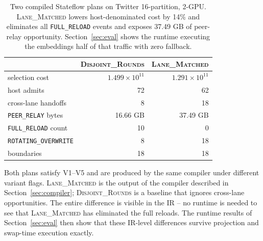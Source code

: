 \begin{table}[h]
\centering
\small
\begin{tabular}{lrr}
\toprule
 & \textsc{Disjoint\_Rounds} & \textsc{Lane\_Matched} \\
\midrule
selection cost        & $1.499 \times 10^{11}$ & $1.291 \times 10^{11}$ \\
host admits           & 72                     & 62                     \\
cross-lane handoffs   & 8                      & 18                     \\
\texttt{PEER\_RELAY} bytes & 16.66 GB          & 37.49 GB               \\
\texttt{FULL\_RELOAD} count & 10               & 0                      \\
\texttt{ROTATING\_OVERWRITE} & 8               & 18                     \\
boundaries            & 18                     & 18                     \\
\bottomrule
\end{tabular}
\caption{Two compiled Stateflow plans on Twitter 16-partition, 2-GPU.
\textsc{Lane\_Matched} lowers host-denominated cost by 14\% and
eliminates all \texttt{FULL\_RELOAD} events and exposes 37.49 GB of
peer-relay opportunity. Section~\ref{sec:eval} shows the runtime
executing the embeddings half of that traffic with zero fallback.}
\label{tab:ir:example}
\end{table}

Both plans satisfy V1--V5 and are produced by the same compiler under
different variant flags. \textsc{Lane\_Matched} is the output of the
compiler described in Section~\ref{sec:compiler}; \textsc{Disjoint\_Rounds}
is a baseline that ignores cross-lane opportunities. The entire
difference is visible in the IR -- no runtime is needed to see that
\textsc{Lane\_Matched} has eliminated the full reloads. The runtime
results of Section~\ref{sec:eval} then show that these IR-level
differences survive projection and swap-time execution exactly.
